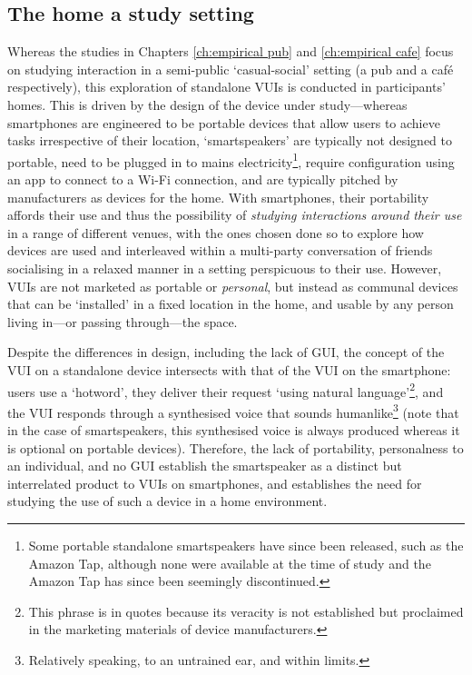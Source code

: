 


\subsection{The home a study setting}\label{sec:empirical home design setting}
\begin{revisedsubmission}
Whereas the studies in Chapters \ref{ch:empirical pub} and \ref{ch:empirical cafe} focus on studying interaction in a semi-public `casual-social' setting (a pub and a caf\'{e} respectively), this exploration of standalone \acp{VUI} is conducted in participants' homes.
This is driven by the design of the device under study---whereas smartphones are engineered to be portable devices that allow users to achieve tasks irrespective of their location, `smartspeakers' are typically not designed to portable, need to be plugged in to mains electricity\footnote{Some portable standalone smartspeakers have since been released, such as the Amazon Tap, although none were available at the time of study and the Amazon Tap has since been seemingly discontinued.}, require configuration using an app to connect to a Wi-Fi connection, and are typically pitched by manufacturers as devices for the home.
With smartphones, their portability affords their use and thus the possibility of \textit{studying interactions around their use} in a range of different venues, with the ones chosen done so to explore how devices are used and interleaved within a multi-party conversation of friends socialising in a relaxed manner in a setting perspicuous to their use.
However, \acp{VUI} are not marketed as portable or \textit{personal}, but instead as communal devices that can be `installed' in a fixed location in the home, and usable by any person living in---or passing through---the space.

Despite the differences in design, including the lack of \acf{GUI}, the concept of the \ac{VUI} on a standalone device intersects with that of the \ac{VUI} on the smartphone: users use a `hotword', they deliver their request `using natural language'\footnote{This phrase is in quotes because its veracity is not established but proclaimed in the marketing materials of device manufacturers.}, and the \ac{VUI} responds through a synthesised voice that sounds humanlike\footnote{Relatively speaking, to an untrained ear, and within limits.} (note that in the case of smartspeakers, this synthesised voice is always produced whereas it is optional on portable devices).
Therefore, the lack of portability, personalness to an individual, and no \ac{GUI} establish the smartspeaker as a distinct but interrelated product to \acp{VUI} on smartphones, and establishes the need for studying the use of such a device in a home environment.
\end{revisedsubmission}



